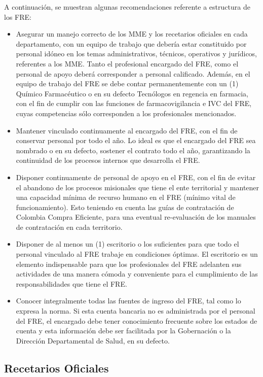 \documentclass[
  oneside]{book}
\begin{document}
A continuación, se muestran algunas recomendaciones referente a estructura de los FRE:

\begin{itemize}
\item
  Asegurar un manejo correcto de los MME y los recetarios oficiales en cada departamento, con un equipo de trabajo que debería estar constituido por personal idóneo en los temas administrativos, técnicos, operativos y jurídicos, referentes a los MME. Tanto el profesional encargado del FRE, como el personal de apoyo deberá corresponder a personal calificado. Además, en el equipo de trabajo del FRE se debe contar permanentemente con un (1) Químico Farmacéutico o en su defecto Tecnólogos en regencia en farmacia, con el fin de cumplir con las funciones de farmacovigilancia e IVC del FRE, cuyas competencias sólo corresponden a los profesionales mencionados.
\item
  Mantener vinculado continuamente al encargado del FRE, con el fin de conservar personal por todo el año. Lo ideal es que el encargado del FRE sea nombrado o en su defecto, sostener el contrato todo el año, garantizando la continuidad de los procesos internos que desarrolla el FRE.
\item
  Disponer continuamente de personal de apoyo en el FRE, con el fin de evitar el abandono de los procesos misionales que tiene el ente territorial y mantener una capacidad mínima de recurso humano en el FRE (mínimo vital de funcionamiento). Esto teniendo en cuenta las guías de contratación de Colombia Compra Eficiente, para una eventual re-evaluación de los manuales de contratación en cada territorio.
\item
  Disponer de al menos un (1) escritorio o los suficientes para que todo el personal vinculado al FRE trabaje en condiciones óptimas. El escritorio es un elemento indispensable para que los profesionales del FRE adelanten sus actividades de una manera cómoda y conveniente para el cumplimiento de las responsabilidades que tiene el FRE.
\item
  Conocer integralmente todas las fuentes de ingreso del FRE, tal como lo expresa la norma. Si esta cuenta bancaria no es administrada por el personal del FRE, el encargado debe tener conocimiento frecuente sobre los estados de cuenta y esta información debe ser facilitada por la Gobernación o la Dirección Departamental de Salud, en su defecto.
\end{itemize}

\hypertarget{recetarios-oficiales-1}{%
\subsection{Recetarios Oficiales}\label{recetarios-oficiales-1}}
\end{document}

